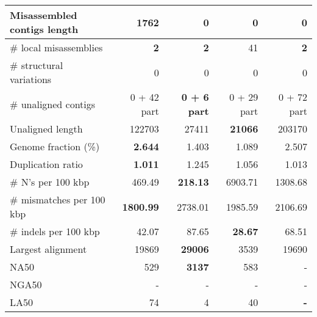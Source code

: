 \documentclass[12pt,a4paper]{article}
\begin{document}
\begin{table}[ht]
\begin{center}
\begin{tabular}{|l*{4}{|r}|}
Misassembled contigs length & 1762 & {\bf 0} & {\bf 0} & {\bf 0} \\ \hline
\# local misassemblies & {\bf 2} & {\bf 2} & 41 & {\bf 2} \\ \hline
\# structural variations & 0 & 0 & 0 & 0 \\ \hline
\# unaligned contigs & 0 + 42 part & {\bf 0 + 6 part} & 0 + 29 part & 0 + 72 part \\ \hline
Unaligned length & 122703 & 27411 & {\bf 21066} & 203170 \\ \hline
Genome fraction (\%) & {\bf 2.644} & 1.403 & 1.089 & 2.507 \\ \hline
Duplication ratio & {\bf 1.011} & 1.245 & 1.056 & 1.013 \\ \hline
\# N's per 100 kbp & 469.49 & {\bf 218.13} & 6903.71 & 1308.68 \\ \hline
\# mismatches per 100 kbp & {\bf 1800.99} & 2738.01 & 1985.59 & 2106.69 \\ \hline
\# indels per 100 kbp & 42.07 & 87.65 & {\bf 28.67} & 68.51 \\ \hline
Largest alignment & 19869 & {\bf 29006} & 3539 & 19690 \\ \hline
NA50 & 529 & {\bf 3137} & 583 & - \\ \hline
NGA50 & - & - & - & - \\ \hline
LA50 & 74 & 4 & 40 & {\bf -} \\ \hline
\end{tabular}
\end{center}
\end{table}
\end{document}
